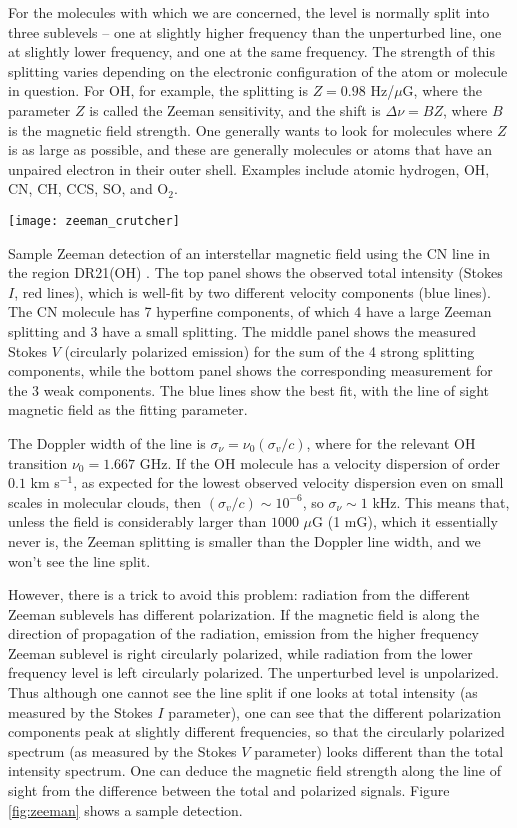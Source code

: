 For the molecules with which we are concerned, the level is normally split into three sublevels -- one at slightly higher frequency than the unperturbed line, one at slightly lower frequency, and one at the same frequency. The strength of this splitting varies depending on the electronic configuration of the atom or molecule in question. For OH, for example, the splitting is $Z=0.98$ Hz/$\mu$G, where the parameter $Z$ is called the Zeeman sensitivity, and the shift is $\Delta \nu = BZ$, where $B$ is the magnetic field strength. One generally wants to look for molecules where $Z$ is as large as possible, and these are generally molecules or atoms that have an unpaired electron in their outer shell. Examples include atomic hydrogen, OH, CN, CH, CCS, SO, and O$_2$.

\begin{marginfigure}
\texttt{[image: zeeman\_crutcher]}
\caption[Sample Zeeman Detection of a Magnetic Field]{
\label{fig:zeeman}
Sample Zeeman detection of an interstellar magnetic field using the CN line in the region DR21(OH) \citep{crutcher12a}. The top panel shows the observed total intensity (Stokes $I$, red lines), which is well-fit by two different velocity components (blue lines). The CN molecule has 7 hyperfine components, of which 4 have a large Zeeman splitting and 3 have a small splitting. The middle panel shows the measured Stokes $V$ (circularly polarized emission) for the sum of the 4 strong splitting components, while the bottom panel shows the corresponding measurement for the 3 weak components. The blue lines show the best fit, with the line of sight magnetic field as the fitting parameter.
}
\end{marginfigure}
The Doppler width of the line is $\sigma_{\nu} = \nu_0 (\sigma_v/c)$, where for the relevant OH transition $\nu_0=1.667$ GHz. If the OH molecule has a velocity dispersion of order $0.1$ km s$^{-1}$, as expected for the lowest observed velocity dispersion even on small scales in molecular clouds, then $(\sigma_v/c)\sim 10^{-6}$, so $\sigma_{\nu} \sim 1$ kHz. This means that, unless the field is considerably larger than $1000$ $\mu$G (1 mG), which it essentially never is, the Zeeman splitting is smaller than the Doppler line width, and we won't see the line split.

However, there is a trick to avoid this problem: radiation from the different Zeeman sublevels has different polarization. If the magnetic field is along the direction of propagation of the radiation, emission from the higher frequency Zeeman sublevel is right circularly polarized, while radiation from the lower frequency level is left circularly polarized. The unperturbed level is unpolarized. Thus although one cannot see the line split if one looks at total intensity (as measured by the Stokes $I$ parameter), one can see that the different polarization components peak at slightly different frequencies, so that the circularly polarized spectrum (as measured by the Stokes $V$ parameter) looks different than the total intensity spectrum. One can deduce the magnetic field strength along the line of sight from the difference between the total and polarized signals. Figure \ref{fig:zeeman} shows a sample detection.

